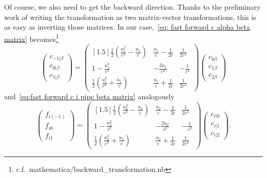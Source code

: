 Of course, we also need to get the backward direction.
Thanks to the preliminary work of writing the transformation as two matrix-vector transformations, this is as easy as inverting those matrices.
In our case,~\eqref{eq: fast forward c alpha beta matrix} becomes\footnote{c.f.\ mathematica/backward\_transformation.nb}
\begin{equation}
  \begin{pmatrix}
    c_{-1|\beta} \\
    c_{0|\beta} \\
    c_{1|\beta}
  \end{pmatrix}
  =  \begin{pmatrix}[1.5]
    \frac{1}{2}\left(\frac{u_1^2}{c^2}-\frac{u_1}{c}\right)
    & \frac{u_1}{c} - \frac{1}{2c}
    & \frac{1}{2 c^2}
    \\
    1-\frac{u_1^2}{c^2}
    & -\frac{2 u_1}{c^2}
    & -\frac{1}{c^2}
    \\
    \frac{1}{2}\left(\frac{u_1^2}{c^2}+\frac{u_1}{c}\right)
    & \frac{u_1}{c} + \frac{1}{2c}
    & \frac{1}{2 c^2}
  \end{pmatrix}
  \begin{pmatrix}
    c_{0\beta} \\
    c_{1\beta} \\
    c_{2\beta}
  \end{pmatrix}
\end{equation}
and~\eqref{eq:fast forward c i pipe beta matrix} analogously
\begin{equation}
  \begin{pmatrix}
    f_{i(-1)} \\
    f_{i0} \\
    f_{i1}
  \end{pmatrix}
  =
  \begin{pmatrix}[1.5]
    \frac{1}{2}\left(\frac{u_2^2}{c^2}-\frac{u_2}{c}\right)
    & \frac{u_2}{c} - \frac{1}{2c}
    & \frac{1}{2 c^2}
    \\
    1-\frac{u_2^2}{c^2}
    & -\frac{2 u_2}{c^2}
    & -\frac{1}{c^2}
    \\
    \frac{1}{2}\left(\frac{u_2^2}{c^2}+\frac{u_2}{c}\right)
    & \frac{u_2}{c} + \frac{1}{2c}
    & \frac{1}{2 c^2}
  \end{pmatrix}
  \begin{pmatrix}
      c_{i|0} \\
      c_{i|1} \\
      c_{i|2}
    \end{pmatrix}.
\end{equation}
